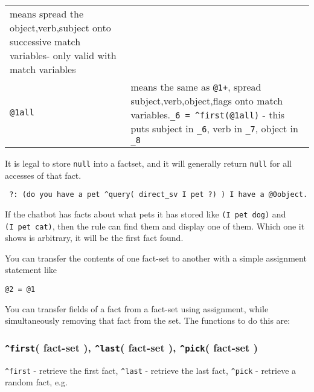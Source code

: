 \documentclass[]{article}
\begin{document}
\begin{longtable}[]{@{}ll@{}}
\begin{minipage}[t]{0.16\columnwidth}
means spread the object,verb,subject onto successive match variables-
only valid with match variables\strut
\end{minipage}\tabularnewline
\begin{minipage}[t]{0.18\columnwidth}\raggedright\strut
\texttt{@1all}\strut
\end{minipage} & \begin{minipage}[t]{0.16\columnwidth}\raggedright\strut
means the same as \texttt{@1+}, spread subject,verb,object,flags onto
match variables.\texttt{\_6\ =\ \^{}first(@1all)} - this puts subject in
\texttt{\_6}, verb in \texttt{\_7}, object in \texttt{\_8}\strut
\end{minipage}\tabularnewline
\bottomrule
\end{longtable}

It is legal to store \texttt{null} into a factset, and it will generally
return \texttt{null} for all accesses of that fact.

\begin{verbatim}
 ?: (do you have a pet ^query( direct_sv I pet ?) ) I have a @0object.
\end{verbatim}

If the chatbot has facts about what pets it has stored like
\texttt{(I\ pet\ dog)} and \texttt{(I\ pet\ cat)}, then the rule can
find them and display one of them. Which one it shows is arbitrary, it
will be the first fact found.

You can transfer the contents of one fact-set to another with a simple
assignment statement like

\begin{verbatim}
@2 = @1
\end{verbatim}

You can transfer fields of a fact from a fact-set using assignment,
while simultaneously removing that fact from the set. The functions to
do this are:

\subsubsection{\texorpdfstring{\texttt{\^{}first}( fact-set ),
\texttt{\^{}last}( fact-set ), \texttt{\^{}pick}( fact-set
)}{\^{}first( fact-set ), \^{}last( fact-set ), \^{}pick( fact-set )}}\label{first-fact-set-last-fact-set-pick-fact-set}

\texttt{\^{}first} - retrieve the first fact, \texttt{\^{}last} -
retrieve the last fact, \texttt{\^{}pick} - retrieve a random fact, e.g.
\end{document}
